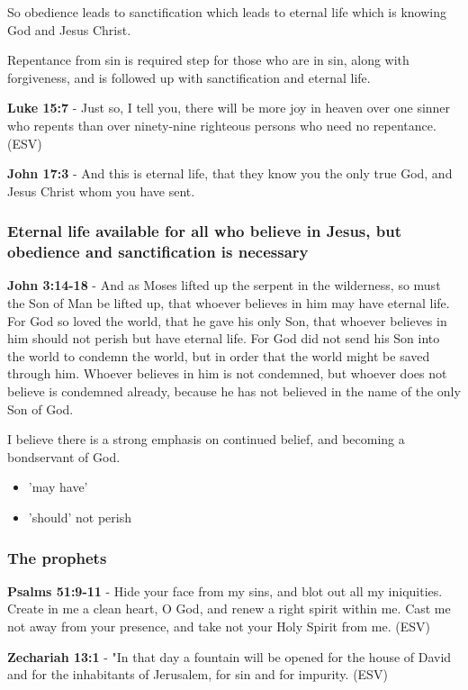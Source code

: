 \documentclass[11pt]{article}
\begin{document}
So obedience leads to sanctification which leads to eternal life which is knowing God and Jesus Christ.

Repentance from sin is required step for those who are in sin, along with forgiveness, and is followed up with sanctification and eternal life.

\textbf{Luke 15:7} - Just so, I tell you, there will be more joy in heaven over one sinner who repents than over ninety-nine righteous persons who need no repentance. (ESV)

\textbf{John 17:3} - And this is eternal life, that they know you the only true God, and Jesus Christ whom you have sent.

\subsubsection{Eternal life \textbf{available} for all who believe in Jesus, but obedience and sanctification is necessary}
\label{sec:org8b2a4c7}
\textbf{John 3:14-18} - And as Moses lifted up the serpent in the wilderness, so must the Son of Man be lifted up, that whoever believes in him may have eternal life. For God so loved the world, that he gave his only Son, that whoever believes in him should not perish but have eternal life. For God did not send his Son into the world to condemn the world, but in order that the world might be saved through him. Whoever believes in him is not condemned, but whoever does not believe is condemned already, because he has not believed in the name of the only Son of God.

I believe there is a strong emphasis on continued belief, and becoming a bondservant of God.
\begin{itemize}
\item 'may have'
\item 'should' not perish
\end{itemize}

\subsubsection{The prophets}
\label{sec:org965c9be}
\textbf{Psalms 51:9-11} - Hide your face from my sins, and blot out all my iniquities. Create in me a clean heart, O God, and renew a right spirit within me. Cast me not away from your presence, and take not your Holy Spirit from me. (ESV)

\textbf{Zechariah 13:1} - "In that day a fountain will be opened for the house of David and for the inhabitants of Jerusalem, for sin and for impurity. (ESV)
\end{document}
